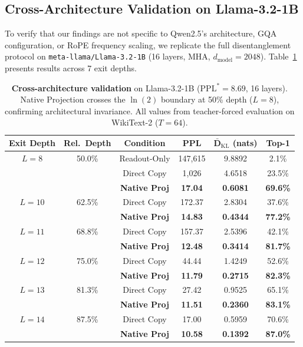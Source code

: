 \documentclass{article}
\newcommand{\kl}{\bar{D}_{\mathrm{KL}}}
\begin{document}
\subsection{Cross-Architecture Validation on Llama-3.2-1B}

To verify that our findings are not specific to Qwen2.5's architecture, GQA configuration, or RoPE frequency scaling, we replicate the full disentanglement protocol on \texttt{meta-llama/Llama-3.2-1B} (16 layers, MHA, $d_{\text{model}} = 2048$). Table~\ref{tab:llama} presents results across 7 exit depths.

\begin{table}[t]
\centering
\caption{\textbf{Cross-architecture validation} on Llama-3.2-1B ($\text{PPL}^* = 8.69$, 16 layers). Native Projection crosses the $\ln(2)$ boundary at 50\% depth ($L{=}8$), confirming architectural invariance. All values from teacher-forced evaluation on WikiText-2 ($T=64$).}
\label{tab:llama}
\small
\begin{tabular}{@{}cccccc@{}}
\toprule
\textbf{Exit Depth} & \textbf{Rel.\ Depth} & \textbf{Condition} & \textbf{PPL} & $\boldsymbol{\kl}$ \textbf{(nats)} & \textbf{Top-1} \\
\midrule
$L = 8$ & 50.0\% & Readout-Only & 147,615 & 9.8892 & 2.1\% \\
 & & Direct Copy & 1,026 & 4.6518 & 23.5\% \\
 & & \textbf{Native Proj} & \textbf{17.04} & \textbf{0.6081} & \textbf{69.6\%} \\
\midrule
$L = 10$ & 62.5\% & Direct Copy & 172.37 & 2.8304 & 37.6\% \\
 & & \textbf{Native Proj} & \textbf{14.83} & \textbf{0.4344} & \textbf{77.2\%} \\
\midrule
$L = 11$ & 68.8\% & Direct Copy & 157.37 & 2.5396 & 42.1\% \\
 & & \textbf{Native Proj} & \textbf{12.48} & \textbf{0.3414} & \textbf{81.7\%} \\
\midrule
$L = 12$ & 75.0\% & Direct Copy & 44.44 & 1.4249 & 52.6\% \\
 & & \textbf{Native Proj} & \textbf{11.79} & \textbf{0.2715} & \textbf{82.3\%} \\
\midrule
$L = 13$ & 81.3\% & Direct Copy & 27.42 & 0.9525 & 65.1\% \\
 & & \textbf{Native Proj} & \textbf{11.51} & \textbf{0.2360} & \textbf{83.1\%} \\
\midrule
$L = 14$ & 87.5\% & Direct Copy & 17.00 & 0.5959 & 70.6\% \\
 & & \textbf{Native Proj} & \textbf{10.58} & \textbf{0.1392} & \textbf{87.0\%} \\
\bottomrule
\end{tabular}
\end{table}
\end{document}
